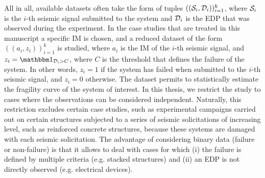 All in all, available datasets often take the form of tuples $((\mathcal{S}_i,\mathcal{D}_i))_{i=1}^k$, where $\mathcal{S}_i$ is the $i$-th seismic signal submitted to the system and $\mathcal{D}_i$ is the EDP that was observed during the experiment. %
%
In the case studies that are treated in this manuscript a specific IM is chosen, and a reduced dataset of the form $((a_i,z_i))_{i=1}^k$ is studied, where $a_i$ is the IM of the $i$-th seismic signal, and $z_i=\indic_{\cD_i> C }$, where $ C $ is the threshold that defines the failure of the system. In other words, $z_i=1$ if the system has failed when submitted to the  $i$-th seismic signal, and $z_i=0$ otherwise.
The dataset permits to statistically estimate the fragility curve of the system of interest. In this thesis, we restrict the study to cases where the observations can be considered independent. 
Naturally, this restriction excludes certain case studies, such as experimental campaigns carried out on certain structures subjected to a series of seismic solicitations of increasing level, such as reinforced concrete structures, because these systems are damaged with each seismic solicitation.
%
The advantage of considering binary data (failure or non-failure) is that it allows to deal with cases for which (i) the failure is defined by multiple criteria (e.g. stacked structures) and (ii) an EDP is not directly observed (e.g. electrical devices).




